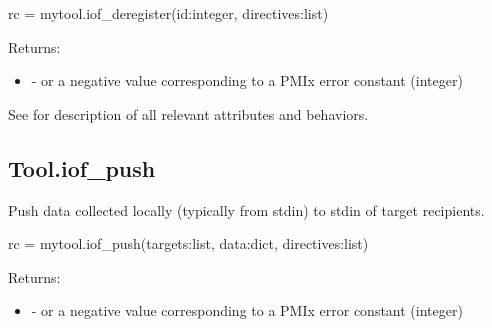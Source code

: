 \pyspecificstart
\begin{codepar}
rc = mytool.iof_deregister(id:integer, directives:list)
\end{codepar}
\pyspecificend

\begin{arglist}
\end{arglist}

Returns:

\begin{itemize}
    \item {} -  or a negative value corresponding to a PMIx error constant (integer)
\end{itemize}

See  for description of all relevant attributes and behaviors.


\subsection{Tool.iof_push}

\summary

Push data collected locally (typically from stdin) to
stdin of target recipients.

\format

\pyspecificstart
\begin{codepar}
rc = mytool.iof_push(targets:list, data:dict, directives:list)
\end{codepar}
\pyspecificend

\begin{arglist}
\end{arglist}

Returns:

\begin{itemize}
    \item {} -  or a negative value corresponding to a PMIx error constant (integer)
\end{itemize}

